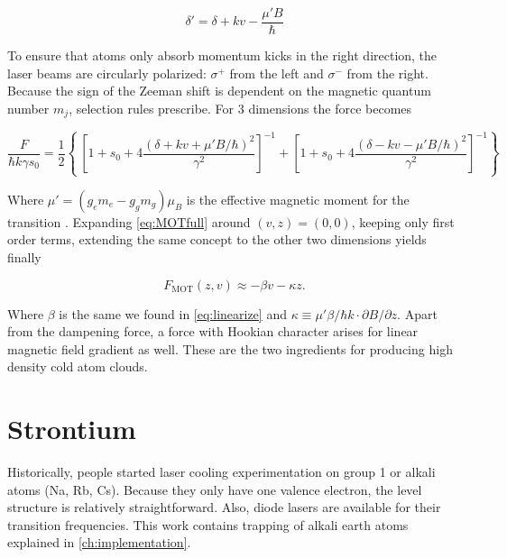 \begin{equation}\label{eq:DetuningFull}
	\delta' = \delta + k v - \frac{\mu'B}{\hbar}
\end{equation}

To ensure that atoms only absorb momentum kicks in the right direction, the laser beams are circularly polarized: $\sigma^+$ from the left and $\sigma^-$ from the right. Because the sign of the Zeeman shift is dependent on the magnetic quantum number $m_j$, selection rules prescribe. For 3 dimensions the force becomes

\begin{equation}\label{eq:MOTfull}
	\frac{F}{\hbar k \gamma s_0} = \frac{1}{2}\left\{\
	\left[1 + s_0 + 4\frac{(\delta+kv+\mu'B/\hbar)^2}{\gamma^2}\right]^{-1}+
	\left[1 + s_0 + 4\frac{(\delta-kv-\mu'B/\hbar)^2}{\gamma^2}\right]^{-1}
	\right\}
\end{equation}

Where $\mu' = (g_e m_e-g_g m_g)\mu_B$ is the effective magnetic moment for the transition \cite{Kowalski2010}. Expanding \cref{eq:MOTfull} around $(v,z) = (0,0)$, keeping only first order terms, extending the same concept to the other two dimensions yields finally

\begin{equation}\label{eq:ForceMOT}
	F_{\text{MOT}}(z,v) \approx -\beta v - \kappa z.
\end{equation}

Where $\beta$ is the same we found in \cref{eq:linearize} and $\kappa \equiv \mu' \beta /\hbar k \cdot \partial B/\partial z$. Apart from the dampening force, a force with Hookian character arises for linear magnetic field gradient as well. These are the two ingredients for producing high density cold atom clouds. 



\section{Strontium}\label{sec:Sr}

Historically, people started laser cooling experimentation on group 1 or alkali atoms (Na, Rb, Cs). Because they only have one valence electron, the level structure is relatively straightforward. Also, diode lasers are available for their transition frequencies. This work contains trapping of alkali earth atoms explained in \cref{ch:implementation}.

